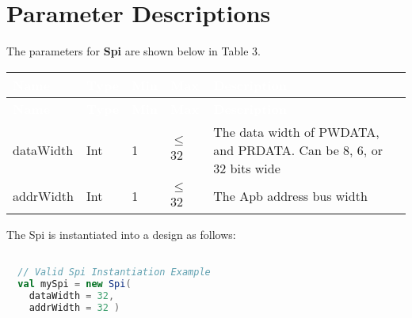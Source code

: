 
\section{Parameter Descriptions}

The parameters for \textbf{Spi} are shown below in
Table 3.

\renewcommand*{\arraystretch}{1.4}
\begingroup
\small
{} %
\begin{longtable}[H]{
    | p{}
    | p{}
    | p{}
    | p{}
    | p{} |
  }
  \hline
  \rowcolor{dark-gray}

  \textcolor{white}{\textbf{Name}} &
  \textcolor{white}{\textbf{Type}} &
  \textcolor{white}{\textbf{Min}} &
  \textcolor{white}{\textbf{Max}} &
  \textcolor{white}{\textbf{Description}} \\ \hline
  \endfirsthead

  \textcolor{white}{\textbf{Name}} &
  \textcolor{white}{\textbf{Type}} &
  \textcolor{white}{\textbf{Min}} &
  \textcolor{white}{\textbf{Max}} &
  \textcolor{white}{\textbf{Description}}            \\ \hline
  \endhead


  \endfoot

  dataWidth   &
  Int       &
  1         &
  $\leq$ 32          &
  The data width of PWDATA, and PRDATA. Can be 8, 6, or 32 bits wide \\ \hline

  addrWidth     &
  Int           &
  1             &
  $\leq$ 32       &
  The Apb address bus width  \\ \hline

\end{longtable}
\captionsetup{aboveskip=0pt}
\label{table:params}
\endgroup

The Spi is instantiated into a design as follows:

\begin{lstlisting}[language=Scala]

  // Valid Spi Instantiation Example
  val mySpi = new Spi(
    dataWidth = 32, 
    addrWidth = 32 ) 

  \end{lstlisting}
